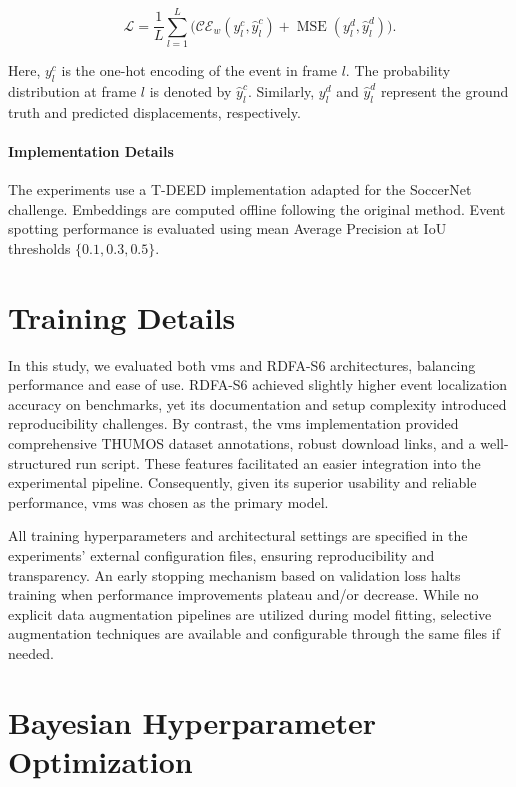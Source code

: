 \[
\mathcal{L} = \frac{1}{L}\sum_{l=1}^{L}\Big(\mathcal{CE}_{w}(y_l^{c},\hat{y}_l^c) + \operatorname{MSE}(y_l^{d},\hat{y}_l^d)\Big).
\]

Here, \(y_l^{c}\) is the one-hot encoding of the event in frame \(l\). The probability distribution at frame \(l\) is denoted by \(\hat{y}_l^c\). Similarly, \(y_l^{d}\) and \(\hat{y}_l^d\) represent the ground truth and predicted displacements, respectively.

\paragraph{Implementation Details} The experiments use a T-DEED implementation adapted for the SoccerNet challenge. Embeddings are computed offline following the original method. Event spotting performance is evaluated using mean Average Precision at IoU thresholds \(\{0.1,0.3,0.5\}\).


\section{Training Details}

In this study, we evaluated both \acrshort{vms} and RDFA-S6 architectures, balancing performance and ease of use. RDFA-S6 achieved slightly higher event localization accuracy on benchmarks, yet its documentation and setup complexity introduced reproducibility challenges. By contrast, the \acrshort{vms} implementation provided comprehensive THUMOS dataset annotations, robust download links, and a well-structured run script. These features facilitated an easier integration into the experimental pipeline. Consequently, given its superior usability and reliable performance, \acrshort{vms} was chosen as the primary model.

All training hyperparameters and architectural settings are specified in the experiments' external configuration files, ensuring reproducibility and transparency. An early stopping mechanism based on validation loss halts training when performance improvements plateau and/or decrease. While no explicit data augmentation pipelines are utilized during model fitting, selective augmentation techniques are available and configurable through the same files if needed.

\section{Bayesian Hyperparameter Optimization}
\label{sec:bayesian_optimization}

